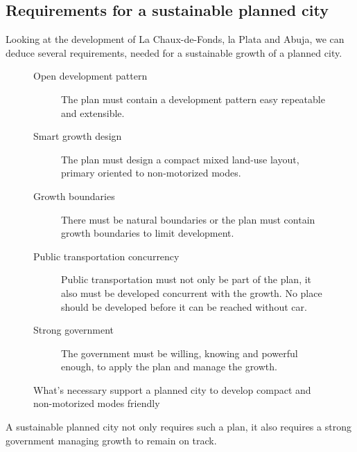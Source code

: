 \documentclass{article}
\begin{document}
\begin{multicols}{2}
		\subsection{Requirements for a sustainable planned city}
		
		Looking at the development of La Chaux-de-Fonds, la Plata and Abuja, we can deduce several requirements, needed for a sustainable growth of a planned city.
		
			\begin{figure}[H]
				\begin{description}
					\item [Open development pattern] The plan must contain a development pattern easy repeatable and extensible.
					\item [Smart growth design] The plan must design a compact mixed land-use layout, primary oriented to non-motorized modes.
					\item [Growth boundaries] There must be natural boundaries or the plan must contain growth boundaries to limit development.
					\item [Public transportation concurrency] Public transportation must not only be part of the plan, it also must be developed concurrent with the growth. No place should be developed before it can be reached without car.
					\item [Strong government] The government must be willing, knowing and powerful enough, to apply the plan and manage the growth.
				\end{description}
				\caption{What's necessary support a planned city to develop compact and non-motorized modes friendly}
				\label{fig:list:abuja-development-reasons}
			\end{figure}
			
			A sustainable planned city not only requires such a plan, it also requires a strong government managing growth to remain on track.
			
			
	\end{multicols}
	
	

	
	
	\clearpage
	\begin{appendix}
		 
		
	
		\listoffigures
	
		\listoftables
	\end{appendix}
\end{document}

